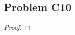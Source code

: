 \documentclass[../../../main.tex]{subfiles}
\begin{document}
\subsection{Problem C10}
\begin{wts}

\end{wts}
\begin{proof}

\end{proof}
\end{document}
